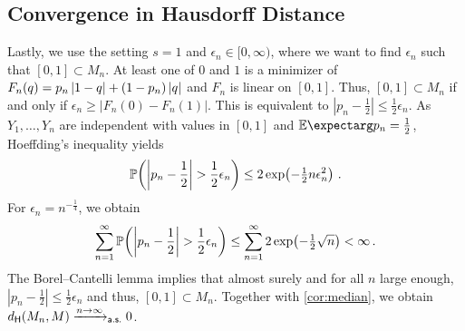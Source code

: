 \subsection{Convergence in Hausdorff Distance}
Lastly, we use the setting $s=1$ and $\epsilon_n\in[0,\infty)$, where we want to find $\epsilon_n$ such that $[0,1] \subset M_n$.
At least one of $0$ and $1$ is a minimizer of $F_n(q)=p_n\left| 1-q \right|+(1-p_n)\left| q \right|$ and $F_n$ is linear on $[0,1]$. Thus, $[0,1] \subset M_n$ if and only if  $\epsilon_n \geq |F_n(0)-F_n(1)|$. This is equivalent to
 $|p_n-\frac12| \leq \frac12\epsilon_n$.
As $Y_1,\dots, Y_n$ are independent with values in $[0,1]$ and $\Ex{p_n} = \frac12$, Hoeffding's inequality \cite[Theorem 2]{hoeffding63} yields
\begin{equation*}
	\mathbb{P}\mathopen{}\left( \left| p_n-\frac12 \right| > \frac12\epsilon_n \right)\mathclose{} \leq 2 \exp\!\left( -\tfrac12 n \epsilon_n^2 \right)
	\, .
\end{equation*}
For $\epsilon_n = n^{-\frac14}$, we obtain
\begin{equation*}
	\sum_{n=1}^\infty \mathbb{P}\mathopen{}\left( \left| p_n-\frac12 \right| > \frac12\epsilon_n \right)\mathclose{}  \leq \sum_{n=1}^\infty 2\exp\!\left( -\tfrac12 \sqrt n \right) < \infty
	\, .
\end{equation*}
The Borel--Cantelli lemma implies that almost surely and for all $n$ large enough,  $|p_n-\frac12| \leq \frac12\epsilon_n$ and thus, $[0,1] \subset M_n$.
Together with \autoref{cor:median}, we obtain $d_{\mathsf{H}}(M_n, M) \xrightarrow{n\to\infty}_{\mathsf{a.s.}} 0$.
%
